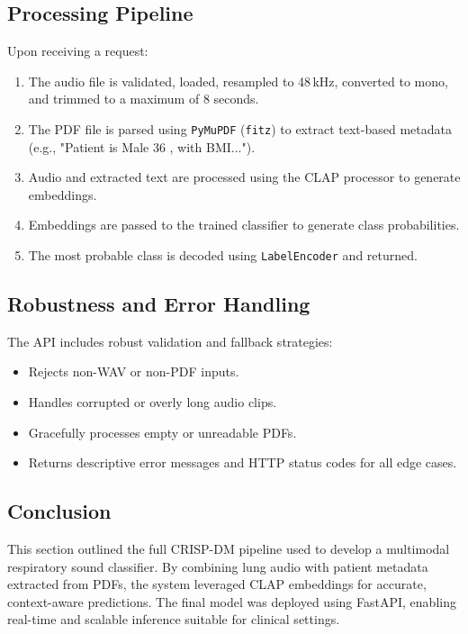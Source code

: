 \subsection{Processing Pipeline}
Upon receiving a request:
\begin{enumerate}
    \item The audio file is validated, loaded, resampled to 48\,kHz, converted to mono, and trimmed to a maximum of 8 seconds.
    \item The PDF file is parsed using \texttt{PyMuPDF} (\texttt{fitz}) to extract text-based metadata (e.g., "Patient is Male 36 , with BMI...").
    \item Audio and extracted text are processed using the CLAP processor to generate embeddings.
    \item Embeddings are passed to the trained classifier to generate class probabilities.
    \item The most probable class is decoded using \texttt{LabelEncoder} and returned.
\end{enumerate}

\subsection{Robustness and Error Handling}
The API includes robust validation and fallback strategies:
\begin{itemize}
    \item Rejects non-WAV or non-PDF inputs.
    \item Handles corrupted or overly long audio clips.
    \item Gracefully processes empty or unreadable PDFs.
    \item Returns descriptive error messages and HTTP status codes for all edge cases.
\end{itemize}

\subsection*{Conclusion}
This section outlined the full CRISP-DM pipeline used to develop a multimodal respiratory sound classifier. By combining lung audio with patient metadata extracted from PDFs, the system leveraged CLAP embeddings for accurate, context-aware predictions. The final model was deployed using FastAPI, enabling real-time and scalable inference suitable for clinical settings.
